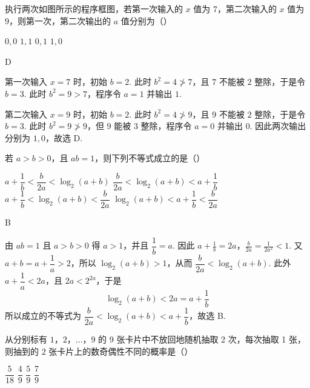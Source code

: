 \begin{problem}
执行两次如图所示的程序框图，若第一次输入的 \(x\) 值为 7，第二次输入的 \(x\) 值为 9，则第一次，第二次输出的 \(a\) 值分别为（\quad）


\choices
    {\(0,0\)}
    {\(1,1\)}
    {\(0,1\)}
    {\(1,0\)}
\end{problem}

\begin{answer}
D
\end{answer}

\begin{solution}
第一次输入 \(x=7\) 时，初始 \(b=2\). 此时 \(b^2=4\not>7\)，且 \(7\) 不能被 \(2\) 整除，于是令 \(b=3\). 此时 \(b^2=9>7\)，程序令 \(a=1\) 并输出 \(1\).

第二次输入 \(x=9\) 时，初始 \(b=2\). 此时 \(b^2=4\not>9\)，且 \(9\) 不能被 \(2\) 整除，于是令 \(b=3\). 此时 \(b^2=9\not>9\)，但 \(9\) 能被 \(3\) 整除，程序令 \(a=0\) 并输出 \(0\). 因此两次输出分别为 \(1,0\)，故选 D.
\end{solution}

\begin{problem}
若 \(a>b>0\)，且 \(ab=1\)，则下列不等式成立的是（\quad）

\choices
    {\(a+\dfrac1b<\dfrac{b}{2a}<\log_2(a+b)\)}
    {\(\dfrac{b}{2a}<\log_2(a+b)<a+\dfrac1b\)}
    {\(a+\dfrac1b<\log_2(a+b)<\dfrac{b}{2a}\)}
    {\(\log_2(a+b)<a+\dfrac1b<\dfrac{b}{2a}\)}
\end{problem}

\begin{answer}
B
\end{answer}

\begin{solution}
由 \(ab=1\) 且 \(a>b>0\) 得 \(a>1\)，并且 \(\dfrac1b=a\). 因此
\(a+\frac1b=2a\)，\(\frac{b}{2a}=\frac1{2a^2}<1\).
又 \(a+b=a+\dfrac1a>2\)，所以 \(\log_2(a+b)>1\)，从而 \(\dfrac{b}{2a}<\log_2(a+b)\). 此外 \(a+\dfrac1a<2a\)，且 \(2a<2^{2a}\)，于是
\[
\log_2(a+b)<2a=a+\frac1b
\]
所以成立的不等式为 \(\dfrac{b}{2a}<\log_2(a+b)<a+\dfrac1b\)，故选 B.
\end{solution}

\begin{problem}
从分别标有 \(1\)，\(2\)，\(\ldots\)，\(9\) 的 9 张卡片中不放回地随机抽取 2 次，每次抽取 1 张，则抽到的 \(2\) 张卡片上的数奇偶性不同的概率是（\quad）

\choices
    {\(\dfrac{5}{18}\)}
    {\(\dfrac{4}{9}\)}
    {\(\dfrac{5}{9}\)}
    {\(\dfrac79\)}
\end{problem}


